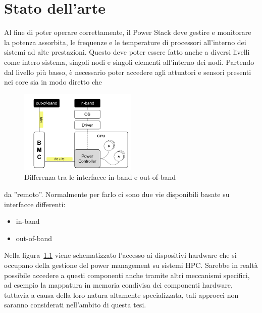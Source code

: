 
\chapter{Stato dell'arte}
Al fine di poter operare correttamente, il Power Stack deve gestire e monitorare la potenza assorbita, le frequenze e le temperature di processori all'interno dei sistemi ad alte prestazioni. Questo deve poter essere fatto anche a diversi livelli come intero sistema, singoli nodi e singoli elementi all'interno dei nodi. Partendo dal livello più basso, è necessario poter accedere agli attuatori e sensori presenti nei core sia in modo diretto che 
\setlength{\intextsep}{1pt} 
\begin{figure}
    \includegraphics[width=0.5\textwidth]{img/SoA.png}
    \centering
    \caption{Differenza tra le interfacce in-band e out-of-band}\label{fig:SoAinoutband}
\end{figure}
da ''remoto''. Normalmente per farlo ci sono due vie disponibili basate su interfacce differenti:
\begin{itemize}
    \item in-band
    \item out-of-band
\end{itemize}
Nella figura~\ref{fig:SoAinoutband} viene schematizzato l'accesso ai dispositivi hardware che si occupano della gestione del power management su sistemi HPC. Sarebbe in realtà possibile accedere a questi componenti anche tramite altri meccanismi specifici, ad esempio la mappatura in memoria condivisa dei componenti hardware, tuttavia a causa della loro natura altamente specializzata, tali approcci non saranno considerati nell'ambito di questa tesi.



